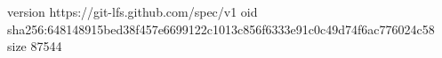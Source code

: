version https://git-lfs.github.com/spec/v1
oid sha256:648148915bed38f457e6699122c1013c856f6333e91c0c49d74f6ac776024c58
size 87544
